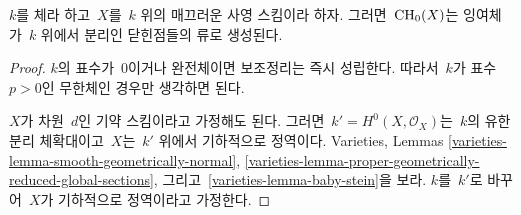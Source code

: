 \begin{lemma}
\label{lemma-generated-by-separable}
$k$를 체라 하고\  $X$를\  $k$ 위의 매끄러운 사영 스킴이라 하자.
그러면\  $\mathop{\mathrm{CH}}\nolimits_0(X)$는 잉여체가\  $k$ 위에서 분리인 닫힌점들의 류로 생성된다.
\end{lemma}

\begin{proof}
$k$의 표수가\  $0$이거나 완전체이면 보조정리는 즉시 성립한다.
따라서\  $k$가 표수\  $p > 0$인 무한체인 경우만 생각하면 된다.

\medskip\noindent
$X$가 차원\  $d$인 기약 스킴이라고 가정해도 된다.
그러면\  $k' = H^0(X, \mathcal{O}_X)$는\  $k$의 유한 분리 체확대이고\ 
$X$는\  $k'$ 위에서 기하적으로 정역이다. Varieties, Lemmas
\ref{varieties-lemma-smooth-geometrically-normal},
\ref{varieties-lemma-proper-geometrically-reduced-global-sections}, 그리고\ 
\ref{varieties-lemma-baby-stein}을 보라. $k$를\  $k'$로 바꾸어\ 
$X$가 기하적으로 정역이라고 가정한다.


\end{proof}

